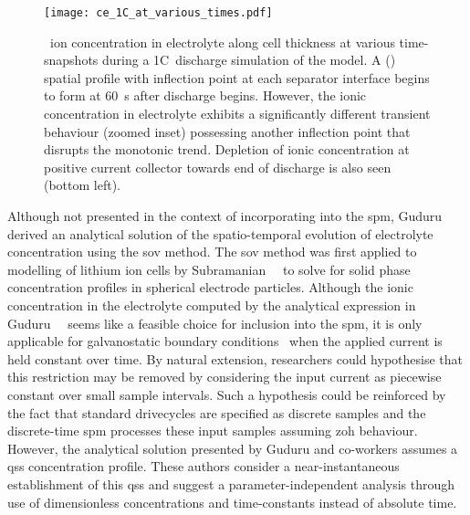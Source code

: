 \begin{figure}[!htbp]
    \centering
    \texttt{[image: ce\_1C\_at\_various\_times.pdf]}
    \caption[Electrolyte conc.\ (time-snapshots) along cell thickness for 1C~discharge]{~ion concentration in electrolyte along cell thickness
        at various time-snapshots during a 1C~discharge simulation of the
         model. A  () spatial
        profile  with inflection point at each separator interface begins to
        form at \approx \SI{60}{\second} after discharge begins. However, the
        ionic concentration in electrolyte exhibits a significantly different
        transient behaviour (zoomed inset) possessing another inflection point
        that disrupts the monotonic trend. Depletion of ionic concentration at
        positive current collector  towards end of discharge is also seen
    (bottom left).}
    \label{fig:ce1cdischgwithzoom}
\end{figure}

Although  not presented  in the  context  of incorporating  into the  \gls{spm},
Guduru~\etal~\cite{Guduru2012}   derived   an   analytical   solution   of   the
spatio-temporal  evolution  of  electrolyte concentration  using  the  \gls{sov}
method.  The \gls{sov}  method was  first applied  to modelling  of lithium  ion
cells  by Subramanian~\etal~\cite{Subramanian2001a}  to  solve  for solid  phase
concentration  profiles in  spherical  electrode particles.  Although the  ionic
concentration  in  the electrolyte  computed  by  the analytical  expression  in
Guduru~\etal~\cite{Guduru2012} seems like a feasible choice for inclusion into
the \gls{spm}, it is only  applicable for galvanostatic  boundary conditions
\ie~when  the applied current  is held  constant over  time. By  natural
extension,  researchers could hypothesise  that this  restriction  may  be
removed  by  considering the  input current as  piecewise constant  over small
sample  intervals. Such  a hypothesis could  be  reinforced  by  the  fact that 
standard  drivecycles  are  specified as  discrete  samples and  the 
discrete-time  \gls{spm} processes  these  input samples assuming \gls{zoh}
behaviour. However, the analytical solution presented by  Guduru and co-workers
assumes a  \gls{qss}  concentration  profile. These  authors consider  a
near-instantaneous  establishment of  this \gls{qss}  and suggest  a
parameter-independent analysis  through use of dimensionless  concentrations and
time-constants instead of absolute time.

